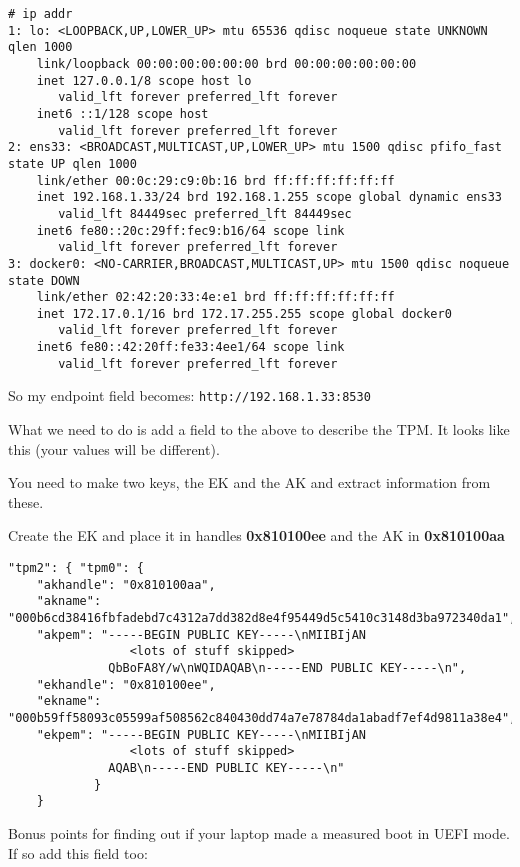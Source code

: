 \documentclass[10pt,a4paper]{article}
\begin{document}
\begin{verbatim}
# ip addr
1: lo: <LOOPBACK,UP,LOWER_UP> mtu 65536 qdisc noqueue state UNKNOWN qlen 1000
    link/loopback 00:00:00:00:00:00 brd 00:00:00:00:00:00
    inet 127.0.0.1/8 scope host lo
       valid_lft forever preferred_lft forever
    inet6 ::1/128 scope host 
       valid_lft forever preferred_lft forever
2: ens33: <BROADCAST,MULTICAST,UP,LOWER_UP> mtu 1500 qdisc pfifo_fast state UP qlen 1000
    link/ether 00:0c:29:c9:0b:16 brd ff:ff:ff:ff:ff:ff
    inet 192.168.1.33/24 brd 192.168.1.255 scope global dynamic ens33
       valid_lft 84449sec preferred_lft 84449sec
    inet6 fe80::20c:29ff:fec9:b16/64 scope link 
       valid_lft forever preferred_lft forever
3: docker0: <NO-CARRIER,BROADCAST,MULTICAST,UP> mtu 1500 qdisc noqueue state DOWN 
    link/ether 02:42:20:33:4e:e1 brd ff:ff:ff:ff:ff:ff
    inet 172.17.0.1/16 brd 172.17.255.255 scope global docker0
       valid_lft forever preferred_lft forever
    inet6 fe80::42:20ff:fe33:4ee1/64 scope link 
       valid_lft forever preferred_lft forever
\end{verbatim}


So my endpoint field becomes: \texttt{http://192.168.1.33:8530}

What we need to do is add a field to the above to describe the TPM. It looks like this (your values will be different).  

You need to make two keys, the EK and the AK and extract information from these. 

Create the EK and place it in handles \textbf{0x810100ee} and the AK in \textbf{0x810100aa}

\begin{verbatim}
"tpm2": { "tpm0": {
    "akhandle": "0x810100aa",
    "akname": "000b6cd38416fbfadebd7c4312a7dd382d8e4f95449d5c5410c3148d3ba972340da1",
    "akpem": "-----BEGIN PUBLIC KEY-----\nMIIBIjAN 
                 <lots of stuff skipped>
              QbBoFA8Y/w\nWQIDAQAB\n-----END PUBLIC KEY-----\n",
    "ekhandle": "0x810100ee",
    "ekname": "000b59ff58093c05599af508562c840430dd74a7e78784da1abadf7ef4d9811a38e4",
    "ekpem": "-----BEGIN PUBLIC KEY-----\nMIIBIjAN
                 <lots of stuff skipped>    
              AQAB\n-----END PUBLIC KEY-----\n"
            } 
    } 
\end{verbatim}



Bonus points for finding out if your laptop made a measured boot in UEFI mode. If so add this field too:
\end{document}
